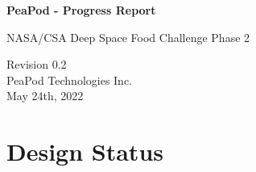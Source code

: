 \documentclass{../tex/report}
\begin{document}
\begin{titlepage}
    \begin{center}
        \vspace*{1.2cm}

        \textbf{\large{PeaPod - Progress Report}}

        \vspace{0.5cm}

        NASA/CSA Deep Space Food Challenge Phase 2

        \vfill
        
        \vspace{.75cm}

        Revision 0.2\\
        PeaPod Technologies Inc.\\
        May 24th, 2022

    \end{center}
\end{titlepage}

\thispagestyle{plain}

\tableofcontents
\newpage

\section{Design Status}



\newpage



\newpage



\newpage



\newpage



\newpage



\newpage



\newpage



\newpage


\end{document}
